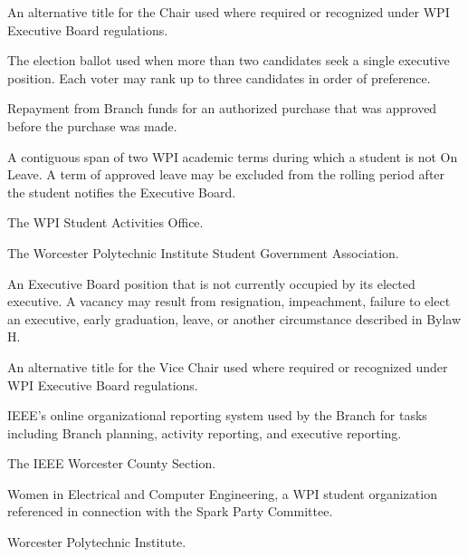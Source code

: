 \documentclass[11pt,a4paper]{article}
\begin{document}
\begin{description}[style=nextline, leftmargin=1.5em]
    \item[President]
    An alternative title for the Chair used where required or recognized under WPI Executive Board regulations.

    \item[Ranked-Choice Ballot]
    The election ballot used when more than two candidates seek a single executive position. Each voter may rank up to three candidates in order of preference.

    \item[Reimbursement]
    Repayment from Branch funds for an authorized purchase that was approved before the purchase was made.
    
    \item[Rolling Semester]
    A contiguous span of two WPI academic terms during which a student is not On Leave. A term of approved leave may be excluded from the rolling period after the student notifies the Executive Board.

    \item[SAO]
    The WPI Student Activities Office.

    \item[SGA]
    The Worcester Polytechnic Institute Student Government Association.

    \item[Vacancy / Vacant Executive Position]
    An Executive Board position that is not currently occupied by its elected executive. A vacancy may result from resignation, impeachment, failure to elect an executive, early graduation, leave, or another circumstance described in Bylaw H.

    \item[Vice President]
    An alternative title for the Vice Chair used where required or recognized under WPI Executive Board regulations.

    \item[vTools]
    IEEE's online organizational reporting system used by the Branch for tasks including Branch planning, activity reporting, and executive reporting.

    \item[WCS]
    The IEEE Worcester County Section.
    
    \item[WECE]
    Women in Electrical and Computer Engineering, a WPI student organization referenced in connection with the Spark Party Committee.
    
    \item[WPI]
    Worcester Polytechnic Institute.
\end{description}
\end{document}
